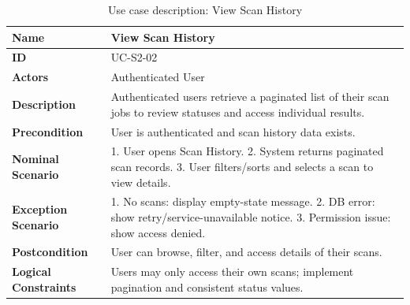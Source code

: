 \begin{table}[H]
    \centering
    \caption{Use case description: View Scan History}
    \label{tab:view-history}
    \renewcommand{\arraystretch}{1.4}
    \small
    \begin{tabularx}{\textwidth}{|p{2.5cm}|X|}
        \hline
        \textbf{Name} & View Scan History \\\hline
        \textbf{ID} & UC-S2-02 \\\hline
        \textbf{Actors} & Authenticated User \\\hline
        \textbf{Description} & Authenticated users retrieve a paginated list of their scan jobs to review statuses and access individual results. \\\hline
        \textbf{Precondition} & User is authenticated and scan history data exists. \\\hline
        \textbf{Nominal Scenario} & 1. User opens Scan History. 2. System returns paginated scan records. 3. User filters/sorts and selects a scan to view details. \\\hline
        \textbf{Exception Scenario} & 1. No scans: display empty-state message. 2. DB error: show retry/service-unavailable notice. 3. Permission issue: show access denied. \\\hline
        \textbf{Postcondition} & User can browse, filter, and access details of their scans. \\\hline
        \textbf{Logical Constraints} & Users may only access their own scans; implement pagination and consistent status values. \\\hline
    \end{tabularx}
\end{table}

